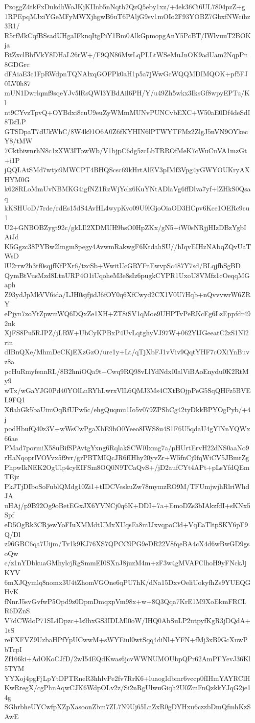 PzoggZ4tkFxDukdhWoJKjKIInb5nNqtb2QzQ5eby1xz/+4ek36Ci6UL7804pzZ+g
1RPEpqMJxiYGeMFyMWXjhgwB6uT6PAljG9sv1mOIo2F93YOBZ7GbxfNWcihz3R1/
R5rfMkCqfBSsadUHgaIFknqItgPiY1Bm0AlkGpmopgAnY5PcBT/IWlvuuT2BOKja
BtZxclBbfVkY8DHaL26rW+/F9QN86MwLqPLLtWSeMuJnOK9adUam2NqpPn8GDGrc
dFAiaE3c1FpRWdpnTQNAlxqGOFPk0aH1p5a7jWwGcWQQMDIMQOK+pf5FJ0LV0h87
mUN1Dwrlqmf9sqeYJv5lRsQWl3YBdAil6PH/Y/u49Zh5wkx3IksGf8wpyEPTu/Kl
nt9CYvzTpvQ+OYBdxi8cuU9euZyWMmMUNvPUNCvbEXC+W50aE0Df4deSdI8TsfLP
GTSDpaT7dUkWhC/8W4k91O6A0Z6fKYHIN6lPTWYTFMz2ZlgJ5nVN9OYkecY8/tMW
7CktbiwnrhN8c1zXW3ITowWb/V1bjpC6dg5zcLbTRROfMeK7cWuCuVA1mzGt+i1P
jQQLAtSMd7wtjc9MWCPT4BHQScsc69kHrtAlEV3pIMf3Vpg4yGWYOUKryAXHYM0G
k628RLoMmUvNBMKG4igfNZ1RzWjYclz6KuYNtADlaVg6ffDlva7yf+lZHkS0Qsaq
kKSHUoD/7rde/rdEs15dS4AvHL4wypKvo09U9lGjoOiaOD3HCpv6Kce1OERc9cu1
U2+GNBOBZygt92c/gkLIl2XDMUH9bsO0HpZKx/gN5+iW0sNRjjHIzDBzYgbIAiJd
K5Ggzc38PYBw2lmgm8pegy4AvwmRakwgF6KtdahSU//hIqvEIHzNAbqZQvUaTWsD
lU2rrw2h3tf0sqjfKfPXr6/tzcSb+WwitUcGRYFnEwvpSc487Y7sd/BLqjfhSgBD
QymBtVusMzd8LtnURP4O1iUqoheM3e8sIz6pugkCYPR1UxoU8VMfz1cOeqqMGaph
Z93ydJpMkVV6ida/LJH0sjfjidJ6fOY0q6XfCwyd2CX1V0U7Hqb+nQvvvwrW6ZRY
ePjyn7zoYtZpwmWQ6DQxZe1XH+ZT8iSV1qMoe9UHPTvPeRKcEg6LzEppfdr492nk
XjFS8Pu5RJPZ/jLRW+UbCyKPBxP4UvLqtghyVJ97W+062YlJGeeatC2zS1Nl2rin
dIBnQXe/MhmDeCKjEXzGzO/ure1y+Lt/qTjXbFJ1vViv9QqtYHF7cOXiYnBuvz8a
pcHuRmyfennRL/8B2hniOQa9t+Cwq9RQ98vLlYdNdx0IalViBAoEnydu0K2RtMy9
wTx/wGaYJG0Pd40YOlLnRYhLwrxVlL6QMJ3Ms4CXtBOjpPeG5SqQHFz5BVEL9FQ1
XflahGk5baUimOqRfUPw5c/ehgQuqmu1Io5v079ZPShCg42tyDkkBPYOgPyb/+4j
podHbufQ40z3V+wWsCwPgaXhE9bO0Yeeo8IWS8u4S1F6U5qdaU4gYlNnYQWx66ae
PMad7pormiX58uBifSPAvtgYxng6RqlakSCW0Ixmg7a/pHUrtErvH22dNS0aaNo9
rHaNqoprlVOVvx5f9vr/grPBTMIQcJR6fIHhy20yvZr+W5fnCj9fqWiCV5JBmrZg
PhpwIkNEK2OgUlp4cyEIFSm8OQ0N9TCaQvS+/jD2aufCYt4APt+pLsYfdQEmTEjz
PkJTjDIboSoFublQMdg10Zi1+tIDCVeskuZw78mymzRO9M/TFUmjwjhRlriWhdJA
uHAj/p9B92Og9oBetEGxJX6YVNCj0q6K+DDI+7a+EmoDZs3bIAkzfdI+sKNx5Spf
eD5OgRk3CRjewYoFIuXMMdtUMxXUqsFa8mIJxvqpoCld+VqEaTltpSKY6pF9Q/Dl
z96GBC6qa7Uijm/Tv1k9KJ76XS7QPCC9PG9eDR22V8fqeBA4cX4d6wBwGD9gsoQw
c/z1nYDbkuaGMhylcjRgSmmEI0SXnJ8juzM4m+zF3w4gMVAFClhoH9yFNckJjKYV
6mXJQymlq8nomx3U4tZhomVGOne6qPU7hK/dNa15DxvOeliUokyfhZs9YUEQGHvK
fNnrJ5svGvfwP5Opd9z0DpmDmqxpVm98x+w+8Q3Qqa7KrE1M9XoEkmFRCLR6DZnS
V7dCWdoP71SL4Dpzc+Is9hxGS3IDLMl0oW/IHQ0AbSuLP2utpyfKgR3jDQdA+1tS
reFXFVZ9UzbaHPfYpUCwwM+sWYEiul0wtSqq4diNl+YFN+fMj3xB9GcXuwPbTcpI
Zf166ki+AdOKoCJfD/2wI54EQdKwas6jcvWWNUMOUbpQPr62AmPFYevJ36Kl5TYM
YYXoj4pgFjLpYtDPTRneR3hhlvPe2fv7RrK6+luaogIdbmr6vccp0fIHmYAYRClH
KwRregX/cgPhnAqwCJK6WdpOLv2z/Si2nRgUlwuGiqh2U0ZmFnQzkkYJqG2je14g
SGhrbheUYCwfpXZpXasoonZbm7ZL7N9Uj65LnZxR0gDYHxu6czzbDmQfmhKzSAwE
